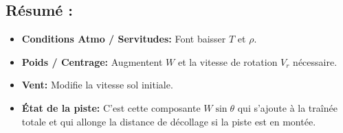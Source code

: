			
		
		
			\subsection*{Résumé :}
			
			\begin{itemize}
				\item \textbf{Conditions Atmo / Servitudes:} Font baisser $T$ et $\rho$.
				\item \textbf{Poids / Centrage:} Augmentent $W$ et la vitesse de rotation $V_r$ nécessaire.
				\item \textbf{Vent:} Modifie la vitesse sol initiale.
				\item \textbf{État de la piste:} C'est cette composante $W \sin \theta$ qui s'ajoute à la traînée totale et qui allonge la distance de décollage si la piste est en montée.\\
				
			\end{itemize}
		
		
	
	
	
	
	
	
	
	
	
	
	
	
	
	
	
	
	
	







